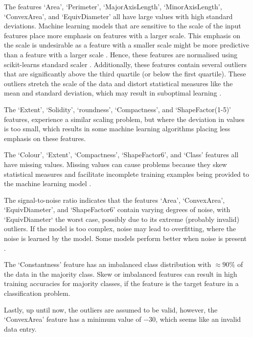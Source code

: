 \documentclass[conference]{IEEEtran}
\begin{document}
The features `Area', `Perimeter', `MajorAxisLength', `MinorAxisLength', `ConvexArea', and `EquivDiameter' all have large values with high standard deviations. Machine learning
models that are sensitive to the scale of the input features place more emphasis on features with a larger scale. This emphasis on the scale is undesirable as a feature with a smaller scale
might be more predictive than a feature with a larger scale \cite{fund}. Hence, these features are normalised using scikit-learns standard scaler \cite{sk}. Additionally, these features contain several outliers that are
significantly above the third quartile (or below the first quartile). These outliers stretch the scale of the data and distort statistical measures like the mean and standard deviation, which may
result in suboptimal learning \cite{fund}.

The `Extent', `Solidity', `roundness', `Compactness', and `ShapeFactor(1-5)' features, experience a similar scaling problem, but where the deviation in values is too small, which results in some machine learning
algorithms placing less emphasis on these features.

The `Colour', `Extent', `Compactness', `ShapeFactor6', and `Class' features all have missing values. Missing values can cause problems because they skew statistical measures and facilitate incomplete
training examples being provided to the machine learning model \cite{fund}. 

The signal-to-noise ratio indicates that the features `Area', `ConvexArea', `EquivDiameter', and `ShapeFactor6' contain varying degrees of noise, with `EquivDiameter` the worst case, possibly due to its extreme (probably invalid) outliers.
If the model is too complex, noise may lead to overfitting, where the noise is learned by the model. Some models perform better when noise is present \cite{fund}.

The `Constantness' feature has an imbalanced class distribution with $\approx 90\%$ of the data in the majority class. Skew or imbalanced features can result in high training accuracies for majority classes,
if the feature is the target feature in a classification problem.

Lastly, up until now, the outliers are assumed to be valid, however, the `ConvexArea' feature has a minimum value of $-30$, which seems like an invalid data entry.
\end{document}
